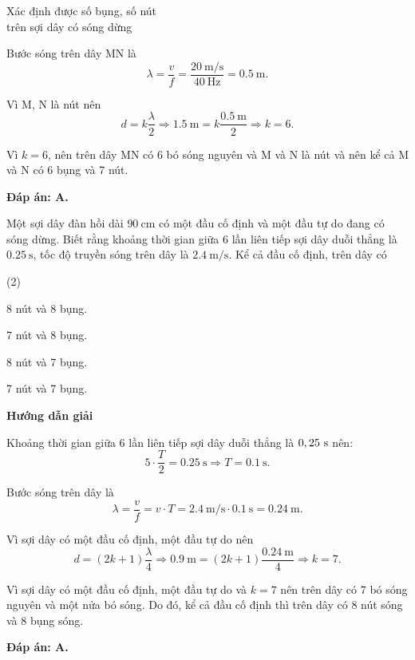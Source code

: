 \begin{dang}{Xác định được số bụng, số nút\\ trên sợi dây có sóng dừng}
{		Bước sóng trên dây MN là
		\begin{equation*}
			\lambda=\frac{v}{f}=\frac{\SI{20}{\meter/\second}}{\SI{40}{\hertz}}=\SI{0,5}{\meter}.
		\end{equation*}
		
		Vì M, N là nút nên
		\begin{equation*}
			d=k\frac{\lambda}{2}\Rightarrow \SI{1,5}{\meter}=k\frac{\SI{0,5}{\meter}}{2}\Rightarrow k=6.
		\end{equation*}
		
		Vì $k=6$, nên trên dây MN có 6 bó sóng nguyên và M và N là nút và nên kể cả M và N có 6 bụng và 7 nút.
		
		\textbf{Đáp án: A.}
	}
	{Một sợi dây đàn hồi dài $\SI{90}{\centi\meter}$ có một đầu cố định và một đầu tự do đang có sóng dừng. Biết rằng khoảng thời gian giữa 6 lần liên tiếp sợi dây duỗi thẳng là $\SI{0,25}{\second}$, tốc độ truyền sóng trên dây là $\SI{2,4}{\meter/\second}$. Kể cả đầu cố định, trên dây có
		\begin{mcq}(2)
			\item 8 nút và 8 bụng.
			\item 7 nút và 8 bụng.
			\item 8 nút và 7 bụng.
			\item 7 nút và 7 bụng.
		\end{mcq}
	}
	{\begin{center}
			\textbf{Hướng dẫn giải}
		\end{center}
		
		Khoảng thời gian giữa 6 lần liên tiếp sợi dây duỗi thẳng là $0,25\ \text s$ nên:
		\begin{equation*}
			5\cdot\frac{T}{2}=\SI{0,25}{\second}\Rightarrow T = \SI{0,1}{\second}.
		\end{equation*}
		
		Bước sóng trên dây là
		\begin{equation*}
			\lambda=\frac{v}{f}=v\cdot T=\SI{2,4}{\meter/\second}\cdot \SI{0,1}{\second}=\SI{0,24}{\meter}.
		\end{equation*}
		
		Vì sợi dây có một đầu cố định, một đầu tự do nên
		\begin{equation*}
			d=(2k+1)\frac{\lambda}{4}\Rightarrow \SI{0,9}{\meter}=(2k+1)\frac{\SI{0,24}{\meter}}{4}\Rightarrow k=7.
		\end{equation*}
		
		Vì sợi dây có một đầu cố định, một đầu tự do và $k=7$ nên trên dây có 7 bó sóng nguyên và một nửa bó sóng. Do đó, kể cả đầu cố định thì trên dây có $8$ nút sóng và $8$ bụng sóng.
		
		
		\textbf{Đáp án: A.}
	}
\end{dang}
